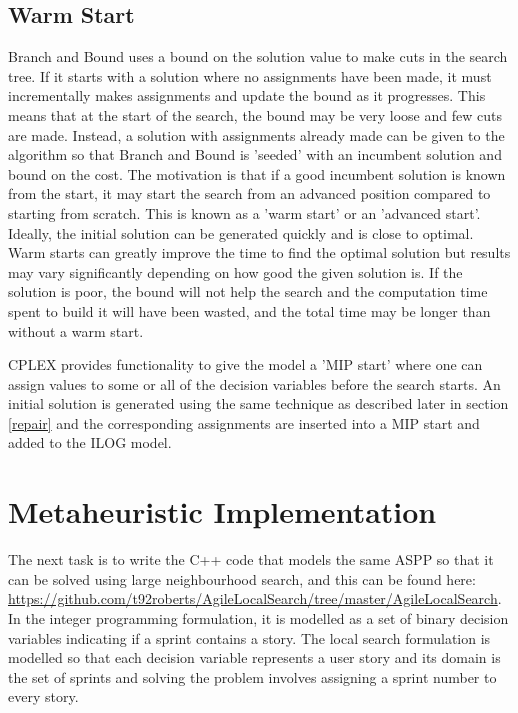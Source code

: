 \subsection{Warm Start} \label{subsec:warm_start}
Branch and Bound uses a bound on the solution value to make cuts in the search tree. If it starts with a solution where no assignments have been made, it must incrementally makes assignments and update the bound as it progresses. This means that at the start of the search, the bound may be very loose and few cuts are made. Instead, a solution with assignments already made can be given to the algorithm so that Branch and Bound is 'seeded' with an incumbent solution and bound on the cost. The motivation is that if a good incumbent solution is known from the start, it may start the search from an advanced position compared to starting from scratch. This is known as a 'warm start' or an 'advanced start'. Ideally, the initial solution can be generated quickly and is close to optimal. Warm starts can greatly improve the time to find the optimal solution but results may vary significantly depending on how good the given solution is. If the solution is poor, the bound will not help the search and the computation time spent to build it will have been wasted, and the total time may be longer than without a warm start.

CPLEX provides functionality to give the model a 'MIP start' where one can assign values to some or all of the decision variables before the search starts. An initial solution is generated using the same technique as described later in section \ref{repair} and the corresponding assignments are inserted into a MIP start and added to the ILOG model.

\section{Metaheuristic Implementation}

The next task is to write the C++ code that models the same ASPP so that it can be solved using large neighbourhood search, and this can be found here: \url{https://github.com/t92roberts/AgileLocalSearch/tree/master/AgileLocalSearch}. In the integer programming formulation, it is modelled as a set of binary decision variables indicating if a sprint contains a story. The local search formulation is modelled so that each decision variable represents a user story and its domain is the set of sprints and solving the problem involves assigning a sprint number to every story.

